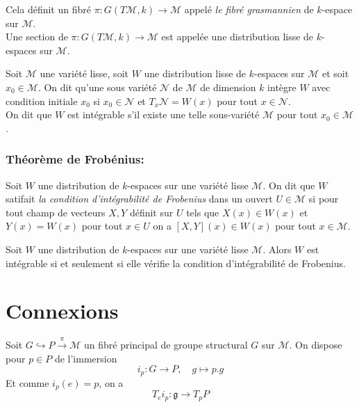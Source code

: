 \documentclass[12pt, a4paper]{book}
\begin{document}
\begin{defi}
Cela définit un fibré $\pi : G(T\mathcal{M}, k) \to \mathcal{M}$ appelé \emph{le fibré grasmannien} de $k$-espace sur $\mathcal{M}$. \\
Une section de $\pi : G(T\mathcal{M}, k) \to \mathcal{M}$ est appelée une distribution lisse de $k$-espaces sur $\mathcal{M}$.
\end{defi}

\begin{defi}
Soit $\mathcal{M}$ une variété lisse, soit $W$ une distribution lisse de $k$-espaces sur $\mathcal{M}$ et soit $x_0\in \mathcal{M}$. On dit qu'une sous variété $\mathcal{N}$ de $\mathcal{M}$ de dimension $k$ intègre $W$ avec condition initiale $x_0$ si $x_0 \in \mathcal{N}$ et $T_x\mathcal{N} = W(x)$ pour tout $x\in \mathcal{N}$. \\
On dit que $W$ est intégrable s'il existe une telle sous-variété $\mathcal{M}$ pour tout $x_0\in \mathcal{M}$.
\end{defi}

\subsubsection{Théorème de Frobénius:}

\begin{defi}
Soit $W$ une distribution de $k$-espaces sur une variété lisse $\mathcal{M}$. On dit que $W$ satifait \emph{la condition d'intégrabilité de Frobenius} dans un ouvert $U\in \mathcal{M}$ si pour tout champ de vecteurs $X,Y$ définit sur $U$ tels que $X(x) \in W(x)$ et $Y(x) = W(x)$ pour tout $x\in U$ on a $[X, Y](x) \in W(x)$ pour tout $x\in \mathcal{M}$.
\end{defi}

\begin{pro}
Soit $W$ une distribution de $k$-espaces sur une variété lisse $\mathcal{M}$. Alors $W$ est intégrable si et seulement si elle vérifie la condition d'intégrabilité de Frobenius.
\end{pro}

\newpage
\section{Connexions}

Soit $G \hookrightarrow P \overset{\pi}{\to} \mathcal{M}$ un fibré principal de groupe structural $G$ sur $\mathcal{M}$. On dispose pour $p\in P$ de l'immersion
$$i_p : G \to P, \quad g \mapsto p.g$$
Et comme $i_p(e) = p$, on a
$$T_e i_p: \mathfrak{g} \to T_pP$$
\end{document}
